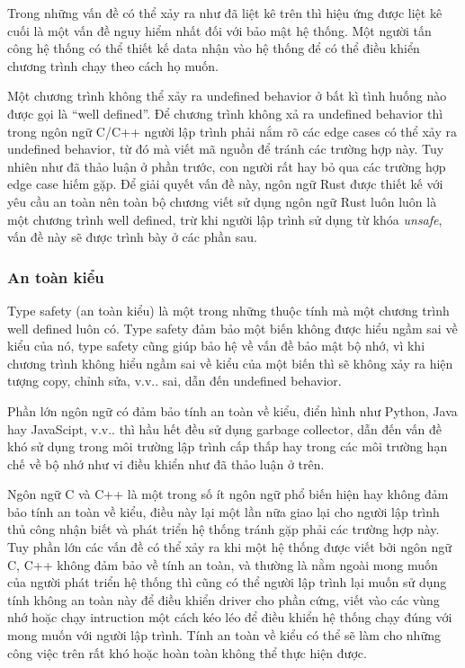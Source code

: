 Trong những vấn đề có thể xảy ra như đã liệt kê trên thì hiệu ứng được liệt kê cuối là một vấn đề nguy hiểm nhất đối với bảo mật hệ thống.
Một người tấn công hệ thống có thể thiết kế data nhận vào hệ thống để có thể điều khiển chương trình chạy theo cách họ muốn.

Một chương trình không thể xảy ra undefined behavior ở bất kì tình huống nào được gọi là ``well defined''.
Để chương trình không xả ra undefined behavior thì trong ngôn ngữ C/C++ người lập trình phải nắm rõ các edge cases có thể xảy ra undefined behavior, từ đó mà viết mã nguồn để tránh các trường hợp này.
Tuy nhiên như đã thảo luận ở phần trước, con người rất hay bỏ qua các trường hợp edge case hiếm gặp.
Để giải quyết vấn đề này, ngôn ngữ Rust được thiết kế với yêu cầu an toàn nên toàn bộ chương viết sử dụng ngôn ngữ Rust luôn luôn là một chương trình well defined, trừ khi người lập trình sử dụng từ khóa \emph{unsafe}, vấn đề này sẽ được trình bày ở các phần sau.

%

\subsubsection{An toàn kiểu}
Type safety (an toàn kiểu) là một trong những thuộc tính mà một chương trình well defined luôn có.
Type safety đảm bảo một biến không được hiểu ngầm sai về kiểu của nó, type safety cũng giúp bảo hệ về vấn đề bảo mật bộ nhớ, vì khi chương trình không hiểu ngầm sai về kiểu của một biến thì sẽ không xảy ra hiện tượng copy, chỉnh sửa, v.v.. sai, dẫn đến undefined behavior.

Phần lớn ngôn ngữ có đảm bảo tính an toàn về kiểu, điển hình như Python, Java hay JavaScipt, v.v.. thì hầu hết đều sử dụng garbage collector, dẫn đến vấn đề khó sử dụng trong môi trường lập trình cấp thấp hay trong các môi trường hạn chế về bộ nhớ như vi điều khiển như đã thảo luận ở trên.

Ngôn ngữ C và C++ là một trong số ít ngôn ngữ phổ biến hiện hay không đảm bảo tính an toàn về kiểu, điều này lại một lần nữa giao lại cho người lập trình thủ công nhận biết và phát triển hệ thống tránh gặp phải các trường hợp này.
Tuy phần lớn các vấn đề có thể xảy ra khi một hệ thống được viết bởi ngôn ngữ C, C++ không đảm bảo về tính an toàn, và thường là nằm ngoài mong muốn của người phát triển hệ thống thì cũng có thể người lập trình lại muốn sử dụng tính không an toàn này để điều khiển driver cho phần cứng, viết vào các vùng nhớ hoặc chạy intruction một cách kéo léo để điều khiển hệ thống chạy đúng với mong muốn với người lập trình.
Tính an toàn về kiểu có thể sẽ làm cho những công việc trên rất khó hoặc hoàn toàn không thể thực hiện được.

